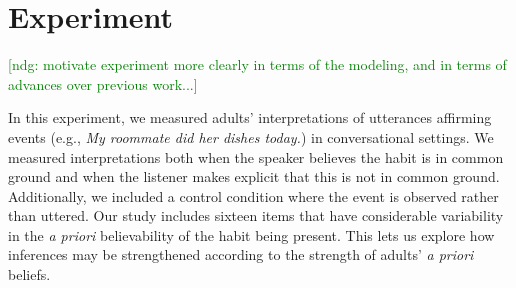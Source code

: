 \documentclass[10pt,letterpaper]{article}
\newcommand{\ndg}[1]{\textcolor{Green}{[ndg: #1]}}
\begin{document}


\section{Experiment}

\ndg{motivate experiment more clearly in terms of the modeling, and in terms of advances over previous work...}

In this experiment, we measured adults' interpretations of utterances affirming events (e.g., \emph{My roommate did her dishes today.}) in conversational settings.  
We measured interpretations both when the speaker believes the habit is in common ground and when the listener makes explicit that this is not in common ground.
Additionally, we included a control condition where the event is observed rather than uttered. 
Our study includes sixteen items that have considerable variability in the \emph{a priori} believability of the habit being present. 
This lets us explore how inferences may be strengthened according to the strength of adults' \emph{a priori} beliefs.

\end{document}
